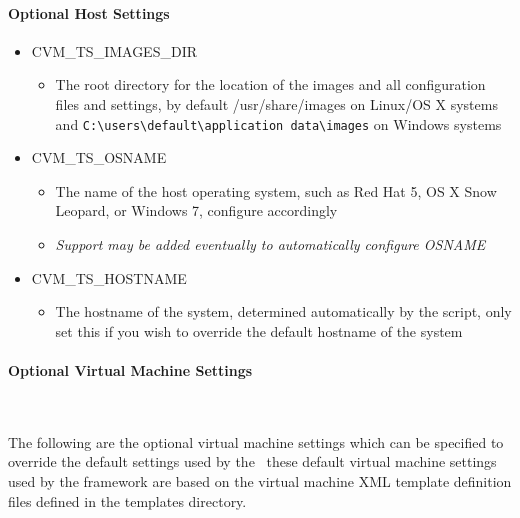 \paragraph*{Optional Host Settings}
\begin{itemize}
\item	CVM\_TS\_IMAGES\_DIR
		\begin{itemize}
		\item	The root directory for the location of the \cernvm images and all
				configuration files and settings, by default /usr/share/images on
				Linux/OS X systems and \verb|C:\users\default\application data\images|
				on Windows systems
		\end{itemize}
		
\item	CVM\_TS\_OSNAME
		\begin{itemize}
		\item	The name of the host operating system, such as Red Hat 5, OS X
				Snow Leopard, or Windows 7, configure accordingly
		\item	\emph{Support may be added eventually to automatically configure OSNAME}
		\end{itemize}
		
\item	CVM\_TS\_HOSTNAME
		\begin{itemize}
		\item	The hostname of the system, determined automatically by the script,
				only set this if you wish to override the default hostname of the
				system
		\end{itemize}
\end{itemize}


\paragraph*{Optional Virtual Machine Settings}~\newline

The following are the optional virtual machine settings which can be specified to override
the default settings used by the \cernvmtestframework\, these default virtual machine settings
used by the framework are based on the virtual machine XML template definition files defined
in the templates directory.
 
